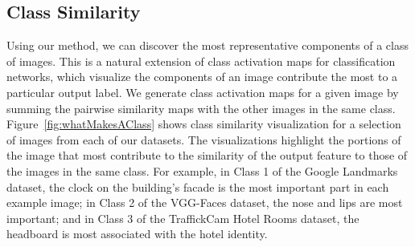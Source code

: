 \subsection{Class Similarity}
Using our method, we can discover the most representative components of a class of images. This is a natural extension of class activation maps for classification networks, which visualize the components of an image contribute the most to a particular output label. We generate class activation maps for a given image by summing the pairwise similarity maps with the other images in the same class.
Figure~\ref{fig:whatMakesAClass} shows class similarity visualization for a selection of images from each of our datasets. The visualizations highlight the
portions of the image that most contribute to the similarity of the output feature to those of the images in the same class. For example, in Class 1 of the Google Landmarks dataset, the clock on the building's facade is the most important part in each example image; in Class 2 of the VGG-Faces dataset, the nose and lips are most important; and in Class 3 of the TraffickCam Hotel Rooms dataset, the headboard is most associated with the hotel identity.

